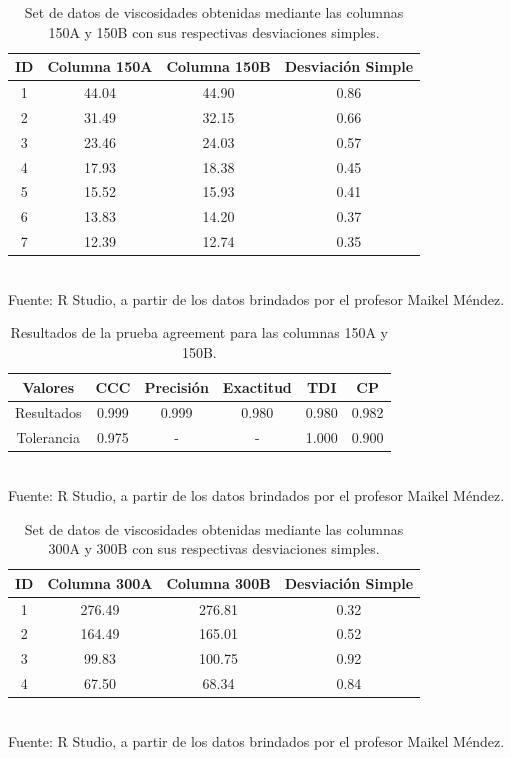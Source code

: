 \documentclass[12, letterpaper]{article}
\begin{document}
\begin{table}[ht]
\centering
\caption{Set de datos de viscosidades obtenidas mediante las columnas 150A y 150B con sus respectivas desviaciones simples.}
\begin{tabular}{cccc}
  \hline
ID & Columna 150A & Columna 150B & Desviación Simple \\ 
  \hline
  1 & 44.04 & 44.90 & 0.86 \\ 
  2 & 31.49 & 32.15 & 0.66 \\ 
  3 & 23.46 & 24.03 & 0.57 \\ 
  4 & 17.93 & 18.38 & 0.45 \\ 
  5 & 15.52 & 15.93 & 0.41 \\ 
  6 & 13.83 & 14.20 & 0.37 \\ 
  7 & 12.39 & 12.74 & 0.35 \\ 
   \hline
\end{tabular}\\
Fuente: R Studio, a partir de los datos brindados por el profesor Maikel Méndez.
\end{table}

\begin{table}[ht]
\centering
\caption{Resultados de la prueba agreement para las columnas 150A y 150B.}
\begin{tabular}{cccccc}
  \hline
Valores & CCC & Precisión & Exactitud & TDI & CP \\ 
  \hline
  Resultados & 0.999 & 0.999 & 0.980 & 0.980 & 0.982 \\ 
  Tolerancia & 0.975 & - & - & 1.000 & 0.900 \\ 
   \hline
\end{tabular}\\
Fuente: R Studio, a partir de los datos brindados por el profesor Maikel Méndez.
\end{table}

\begin{table}[ht]
\centering
\caption{Set de datos de viscosidades obtenidas mediante las columnas 300A y 300B con sus respectivas desviaciones simples.}
\begin{tabular}{cccc}
  \hline
ID & Columna 300A & Columna 300B & Desviación Simple \\ 
  \hline
  1 & 276.49 & 276.81 & 0.32 \\ 
  2 & 164.49 & 165.01 & 0.52 \\ 
  3 & 99.83 & 100.75 & 0.92 \\ 
  4 & 67.50 & 68.34 & 0.84 \\ 
   \hline
\end{tabular}\\
Fuente: R Studio, a partir de los datos brindados por el profesor Maikel Méndez.
\end{table}
\end{document}
